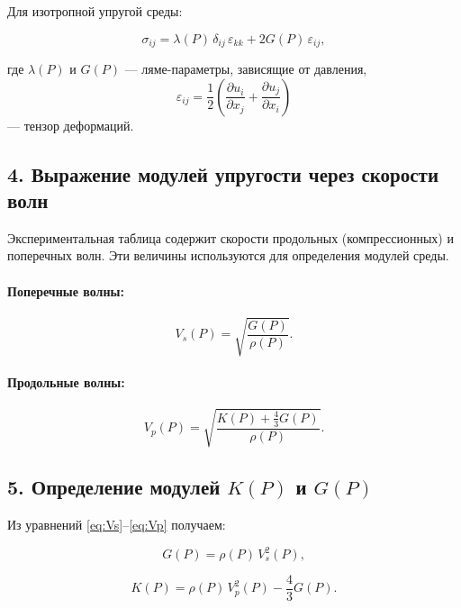 Для изотропной упругой среды:

\begin{equation}
\sigma_{ij}
=
\lambda(P)\, \delta_{ij}\, \varepsilon_{kk}
+
2 G(P)\, \varepsilon_{ij},
\label{eq:constitutive}
\end{equation}

где $\lambda(P)$ и $G(P)$ — ляме-параметры,
зависящие от давления,
\[
\varepsilon_{ij}
=
\frac{1}{2}
\left(
\frac{\partial u_i}{\partial x_j}
+
\frac{\partial u_j}{\partial x_i}
\right)
\]
— тензор деформаций.

\subsection*{4. Выражение модулей упругости через скорости волн}

Экспериментальная таблица содержит скорости продольных (компрессионных) и поперечных волн.
Эти величины используются для определения модулей среды.

\paragraph{Поперечные волны:}
\begin{equation}
V_s(P)
=
\sqrt{\frac{G(P)}{\rho(P)}}.
\label{eq:Vs}
\end{equation}

\paragraph{Продольные волны:}
\begin{equation}
V_p(P)
=
\sqrt{
\frac{
K(P) + \frac{4}{3} G(P)
}{
\rho(P)
}
}.
\label{eq:Vp}
\end{equation}

\subsection*{5. Определение модулей $K(P)$ и $G(P)$}

Из уравнений \eqref{eq:Vs}–\eqref{eq:Vp} получаем:

\begin{equation}
G(P) = \rho(P)\, V_s^2(P),
\label{eq:G}
\end{equation}

\begin{equation}
K(P) = \rho(P)\, V_p^2(P) - \frac{4}{3} G(P).
\label{eq:K}
\end{equation}

